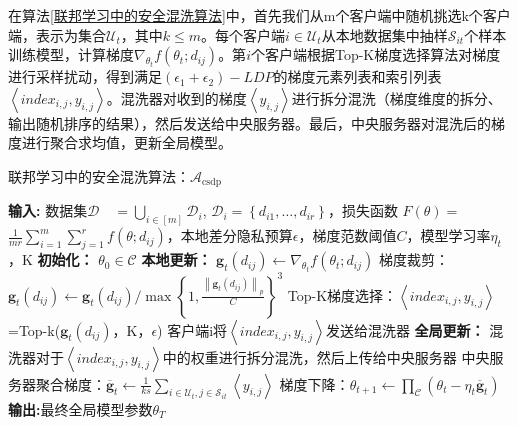 在算法\ref{联邦学习中的安全混洗算法}中，首先我们从m个客户端中随机挑选k个客户端，表示为集合$\mathcal{U}_{t}$，其中$k \leq m$。每个客户端$i \in \mathcal{U}_{t}$从本地数据集中抽样$\mathcal{S}_{i t}$个样本训练模型，计算梯度$\nabla_{\theta_{t}} f\left(\theta_{t} ; d_{i j}\right)$。第$i$个客户端根据Top-K梯度选择算法对梯度进行采样扰动，得到满足$\left(\epsilon_{1}+\epsilon_{2}\right)-LDP$的梯度元素列表和索引列表$\left\langle index_{i,j}, y_{i,j}\right\rangle$。混洗器对收到的梯度$\left\langle y_{i,j} \right\rangle$进行拆分混洗（梯度维度的拆分、输出随机排序的结果），然后发送给中央服务器。最后，中央服务器对混洗后的梯度进行聚合求均值，更新全局模型。

\begin{algorithm}[!htb]
	\caption{联邦学习中的安全混洗算法：$\mathcal{A}_{\text {csdp}}$}
	\label{联邦学习中的安全混洗算法}
	\begin{algorithmic}[1]
		\footnotesize
		\STATE \textbf{输入:} 数据集$\mathcal{D} \quad=\bigcup_{i \in[m]} \mathcal{D}_{i}$, $\mathcal{D}_{i}=\left\{d_{i 1}, \ldots, d_{i r}\right\}$，损失函数 $F(\theta)=$ $\frac{1}{m r} \sum_{i=1}^{m} \sum_{j=1}^{r} f\left(\theta ; d_{i j}\right)$，本地差分隐私预算$\epsilon$，梯度范数阈值$C$，模型学习率$\eta_{t}$，K
		\STATE \textbf{初始化：} $\theta_{0} \in \mathcal{C}$
			\STATE \textbf{本地更新：}
					\STATE $\mathbf{g}_{t}\left(d_{i j}\right) \leftarrow \nabla_{\theta_{t}} f\left(\theta_{t} ; d_{i j}\right)$
					\STATE 梯度裁剪：${\mathbf{g}}_{t}\left(d_{i j}\right) \leftarrow \mathbf{g}_{t}\left(d_{i j}\right) / \max \left\{1, \frac{\left\|\mathbf{g}_{t}\left(d_{i j}\right)\right\|_{p}}{C}\right\}^{3}$
					\STATE Top-K梯度选择：$\left\langle index_{i,j}, y_{i,j}\right\rangle$=Top-k(${\mathbf{g}}_{t}\left(d_{i j}\right)$，K，$\epsilon$)
				\ENDFOR
				\STATE 客户端i将$\left\langle index_{i,j}, y_{i,j}\right\rangle$发送给混洗器
			\ENDFOR
			\STATE \textbf{全局更新：}
			\STATE  混洗器对于$\left\langle index_{i,j}, y_{i,j}\right\rangle$中的权重进行拆分混洗，然后上传给中央服务器
			\STATE 中央服务器聚合梯度：$\overline{\mathbf{g}}_{t} \leftarrow \frac{1}{k s} \sum_{i \in \mathcal{U}_{t}, j \in \mathcal{S}_{i t}} \left\langle y_{i,j} \right\rangle$
			\STATE 梯度下降：$\theta_{t+1} \leftarrow \prod_{\mathcal{C}}\left(\theta_{t}-\eta_{t} \overline{\mathbf{g}}_{t}\right)$
		\ENDFOR
		\STATE \textbf{输出:}最终全局模型参数$\theta_{T}$

	\end{algorithmic}
\end{algorithm}


